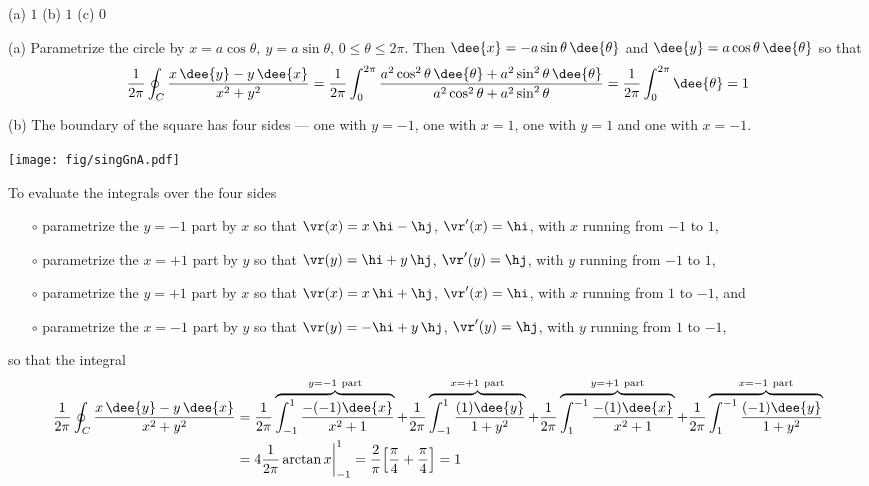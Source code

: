 \begin{answer}
(a) $1$ \qquad
(b) $1$ \qquad
(c) $0$
\end{answer}

\begin{solution}
(a) Parametrize the circle by
$x=a\cos\theta,\ y=a\sin\theta$, $0\le\theta\le 2\pi$. Then
$\dee{x}=-a\sin\theta\,\dee{\theta}$ and
$\dee{y}=a\cos\theta\,\dee{\theta}$ so that
\begin{align*}
\frac{1}{2\pi}\oint_C \frac{x\,\dee{y}-y\,\dee{x}}{x^2+y^2}
=\frac{1}{2\pi}\int_0^{2\pi} \frac{a^2\cos^2\theta\,\dee{\theta}+a^2\sin^2\theta\,\dee{\theta}}
             {a^2\cos^2\theta+a^2\sin^2\theta}
=\frac{1}{2\pi}\int_0^{2\pi}\dee{\theta}=1
\end{align*}

(b) The boundary of the square has four sides --- one
with $y=-1$, one with $x=1$, one with $y=1$ and one with $x=-1$.
\begin{center}
       \texttt{[image: fig/singGnA.pdf]}
\end{center}
To evaluate the integrals over the four sides
\begin{itemize}\itemsep1pt \parskip0pt  %
\item[$\circ$]
parametrize the $y=-1$ part by $x$ so that
$\vr(x)  = x\,\hi-\hj$, $\vr'(x)=\hi$, with $x$ running from $-1$ to $1$,
\item[$\circ$]
parametrize the $x=+1$ part by $y$ so that
$\vr(y)  = \hi+y\,\hj$, $\vr'(y)=\hj$, with $y$ running from $-1$ to $1$,
\item[$\circ$]
parametrize the $y=+1$ part by $x$ so that
$\vr(x)  = x\,\hi+\hj$, $\vr'(x)=\hi$, with $x$ running from $1$ to $-1$, and
\item[$\circ$]
parametrize the $x=-1$ part by $y$ so that
$\vr(y)  = -\hi+y\,\hj$, $\vr'(y)=\hj$, with $y$ running from $1$ to $-1$,
\end{itemize}
so that the integral
\begin{align*}
\frac{1}{2\pi}\oint_C \frac{x\,\dee{y}-y\,\dee{x}}{x^2+y^2}
&=\frac{1}{2\pi}\overbrace{\int_{-1}^1 \frac{-(-1)\dee{x}}{x^2+1}}^{y=-1{\rm\ part}}
+\frac{1}{2\pi}\overbrace{\int_{-1}^1 \frac{(1)\dee{y}}{1+y^2}}^{x=+1{\rm\ part}}
+\frac{1}{2\pi}\overbrace{\int^{-1}_1 \frac{-(1)\dee{x}}{x^2+1}}^{y=+1{\rm\ part}}
+\frac{1}{2\pi}\overbrace{\int^{-1}_1 \frac{(-1)\dee{y}}{1+y^2}}^{x=-1{\rm\ part}}
\\
&=4\frac{1}{2\pi}\arctan x\bigg|_{-1}^1
=\frac{2}{\pi}\Big[\frac{\pi}{4}+\frac{\pi}{4}\Big]
=1
\end{align*}


\end{solution}
